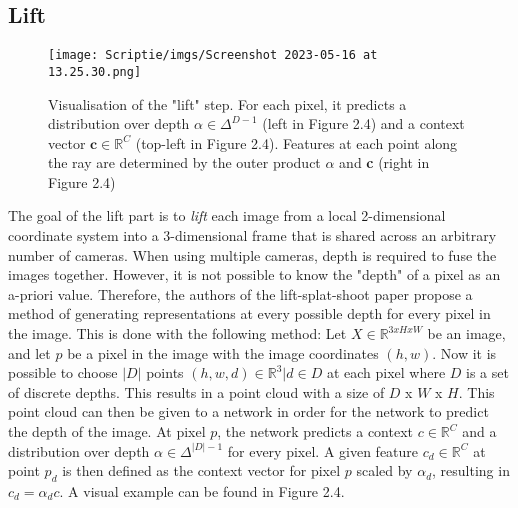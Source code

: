 \documentclass{uva-inf-bachelor-thesis}
\begin{document}
        \subsection{Lift}
            \begin{figure}[H]
            \centering
            \texttt{[image: Scriptie/imgs/Screenshot 2023-05-16 at 13.25.30.png]}
            \caption{Visualisation of the "lift" step. For each pixel, it predicts a distribution over depth $\alpha \in \Delta^{D-1}$ (left in Figure 2.4) and a context vector $\textbf{c} \in \mathbb{R}^C$ (top-left in Figure 2.4). Features at each point along the ray are determined by the outer product $\alpha$ and \textbf{c} (right in Figure 2.4) \cite{liftsplatshoot}}
            \end{figure}

            The goal of the lift part is to \textit{lift} each image from a local 2-dimensional coordinate system into a 3-dimensional frame that is shared across an arbitrary number of cameras. 
            When using multiple cameras, depth is required to fuse the images together. However, it is not possible to know the "depth" of a pixel as an a-priori value. Therefore, the authors of the lift-splat-shoot paper propose a method of generating representations at every possible depth for every pixel in the image.
            This is done with the following method: Let $X \in \mathbb{R}^{3 x H x W}$ be an image, and let $p$ be a pixel in the image with the image coordinates $(h, w)$. Now it is possible to choose $|D|$ points ${(h, w, d) \in \mathbb{R}^3 | d \in D}$ at each pixel where $D$ is a set of discrete depths. This results in a point cloud with a size of $D$ x $W$ x $H$.
            This point cloud can then be given to a network in order for the network to predict the depth of the image. At pixel $p$, the network predicts a context $c \in \mathbb{R}^C$ and a distribution over depth $\alpha \in \Delta^{|D|-1}$ for every pixel. A given feature $c_d \in \mathbb{R}^C$ at point $p_d$ is then defined as the context vector for pixel $p$ scaled by $\alpha_d$, resulting in $c_d = \alpha_dc$. A visual example can be found in Figure 2.4.
        
\end{document}
